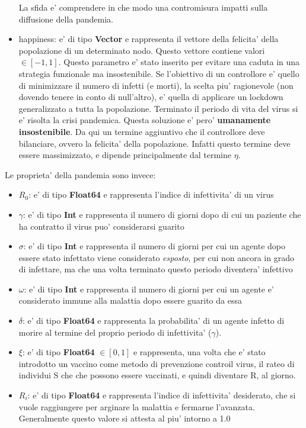 \begin{itemize}
	La sfida e' comprendere in che modo una contromisura impatti sulla diffusione della pandemia.
	\item happiness: e' di tipo \textbf{Vector} e rappresenta il vettore della felicita' della popolazione 
	di un determinato nodo. Questo vettore contiene valori $\in [-1,1]$. Questo parametro e' stato inserito 
	per evitare una caduta in una strategia funzionale ma insostenibile. Se l'obiettivo di un controllore 
	e' quello di minimizzare il numero di infetti (e morti), la scelta piu' ragionevole (non dovendo tenere 
	in conto di null'altro), e' quella di applicare un lockdown generalizzato a tutta la popolazione. 
	Terminato il periodo di vita del virus si e' risolta la crisi pandemica. Questa soluzione e' pero'
	\textbf{umanamente insostenibile}. Da qui un termine aggiuntivo che il controllore deve bilanciare, 
	ovvero la felicita' della popolazione. Infatti questo termine deve essere massimizzato, e dipende 
	principalmente dal termine $\eta$.
\end{itemize}

Le proprieta' della pandemia sono invece:
\begin{itemize}
	\item $R_0$: e' di tipo \textbf{Float64} e rappresenta l'indice di infettivita' di un virus
	\item $\gamma$: e' di tipo \textbf{Int} e rappresenta il numero di giorni dopo di cui un paziente
	che ha contratto il virus puo' considerarsi guarito
	\item $\sigma$: e' di tipo \textbf{Int} e rappresenta il numero di giorni per cui un agente dopo essere
	stato infettato viene considerato \emph{esposto}, per cui non ancora in grado di infettare, ma che una 
	volta terminato questo periodo diventera' infettivo
	\item $\omega$: e' di tipo \textbf{Int} e rappresenta il numero di giorni per cui un agente e' considerato
	immune alla malattia dopo essere guarito da essa
	\item $\delta$: e' di tipo \textbf{Float64} e rappresenta la probabilita' di un agente infetto di morire al 
	termine del proprio periodo di infettivita' ($\gamma$).
	\item $\xi$: e' di tipo \textbf{Float64} $\in [0,1]$ e rappresenta, una volta che e' stato introdotto un vaccino come metodo 
	di prevenzione controil virus, il rateo di individui S che che possono essere vaccinati, e quindi diventare R,
	al giorno.
	\item $R_i$: e' di tipo \textbf{Float64} e rappresenta l'indice di infettivita' desiderato, che si vuole
	raggiungere per arginare la malattia e fermarne l'avanzata. Generalmente questo valore si attesta al piu' 
	intorno a 1.0
\end{itemize}

